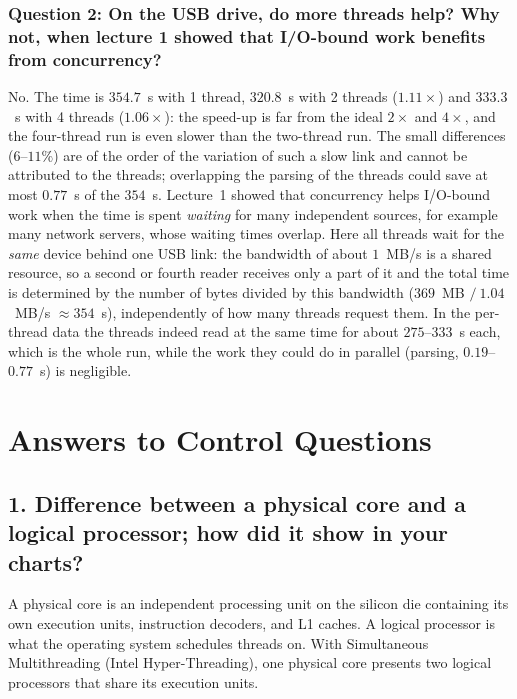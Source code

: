 \documentclass[11pt,a4paper]{article}
\begin{document}
\subsubsection{Question 2: On the USB drive, do more threads help? Why not, when lecture 1 showed that I/O-bound work benefits from concurrency?}
No. The time is $354.7$~s with 1 thread, $320.8$~s with 2 threads ($1.11\times$) and $333.3$~s with 4 threads ($1.06\times$): the speed-up is far from the ideal $2\times$ and $4\times$, and the four-thread run is even slower than the two-thread run. The small differences ($6$--$11\%$) are of the order of the variation of such a slow link and cannot be attributed to the threads; overlapping the parsing of the threads could save at most $0.77$~s of the $354$~s. Lecture~1 showed that concurrency helps I/O-bound work when the time is spent \emph{waiting} for many independent sources, for example many network servers, whose waiting times overlap. Here all threads wait for the \emph{same} device behind one USB link: the bandwidth of about $1$~MB/s is a shared resource, so a second or fourth reader receives only a part of it and the total time is determined by the number of bytes divided by this bandwidth ($369$~MB $/\ 1.04$~MB/s $\approx 354$~s), independently of how many threads request them. In the per-thread data the threads indeed read at the same time for about $275$--$333$~s each, which is the whole run, while the work they could do in parallel (parsing, $0.19$--$0.77$~s) is negligible.

\section{Answers to Control Questions}

\subsection{1. Difference between a physical core and a logical processor; how did it show in your charts?}
A physical core is an independent processing unit on the silicon die containing its own execution units, instruction decoders, and L1 caches. A logical processor is what the operating system schedules threads on. With Simultaneous Multithreading (Intel Hyper-Threading), one physical core presents two logical processors that share its execution units.
\end{document}
